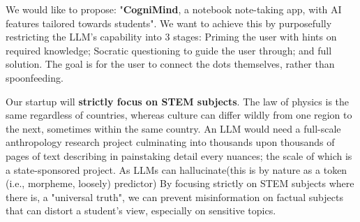 We would like to propose: "\textbf{CogniMind}, a notebook note-taking app, with AI features tailored towards students".
We want to achieve this by purposefully restricting the LLM's capability into 3 stages: Priming the user with hints on
required knowledge; Socratic questioning to guide the user through; and full solution. The goal is for the user to
connect the dots themselves, rather than spoonfeeding.

Our startup will \textbf{strictly focus on STEM subjects}. The law of physics is the same regardless of countries,
whereas culture can differ wildly from one region to the next, sometimes within the same country. An LLM would need a
full-scale anthropology research project culminating into thousands upon thousands of pages of text describing in
painstaking detail every nuances; the scale of which is a state-sponsored project. As LLMs can hallucinate(this is by
nature as a token (i.e., morpheme, loosely) predictor) By focusing strictly on STEM subjects where there is,
a "universal truth", we can prevent misinformation on factual subjects that can distort a student's view, especially on
sensitive topics.